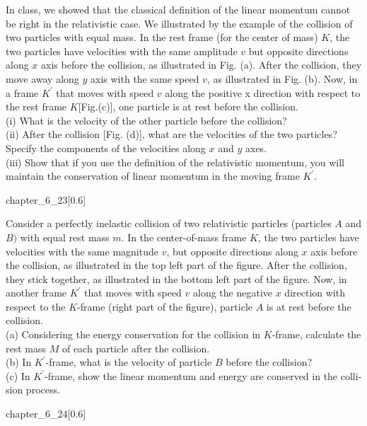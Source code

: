 \begin{example}
    In class, we showed that the classical definition of the linear
momentum cannot be right in the relativistic case. We illustrated by the
example of the collision of two particles with equal mass. In the rest
frame (for the center of mass) $K$, the two particles have velocities with
the same amplitude $v$ but opposite directions along $x$ axis before the
collision, as illustrated in Fig. (a). After the collision, they move away along $y$ axis with the same speed $v$, as illustrated in Fig. (b). Now, in a frame $K^\prime$ that moves with speed $v$ along the positive x direction with respect to the rest frame $K[$Fig.(c)], one particle is at rest before the
collision. 
\\(i) What is the velocity of the other particle before the
collision? 
\\(ii) After the collision [Fig. (d)], what are the velocities of
the two particles? Specify the components of the velocities along $x$ and
$y$ axes.
\\(iii) Show that if you use the definition of the relativistic
momentum, you will maintain the conservation of linear momentum in
the moving frame $K^{\prime}.$
\begin{singlefigure}{chapter_6_23}[0.6]   
\end{singlefigure}
\end{example}
\begin{example}
    Consider a perfectly inelastic collision of two relativistic particles (particles $A$ and $B)$ with equal rest mass $m.$ In the center-of-mass frame $K$, the two particles have velocities with the same magnitude $v$, but opposite directions along $x$ axis before the collision, as illustrated in the top left part of the figure. After the collision, they stick together, as illustrated in the bottom left part of the figure. Now, in another frame $K^\prime$ that moves with speed $v$ along the negative $x$ direction with respect to the $K$-frame (right part of the figure), particle $A$ is at rest before the collision.
    \\(a) Considering the energy conservation for the collision in $K$-frame, calculate the
    rest mass $M$ of each particle after the collision.
    \\(b) In $K^{\prime}$-frame, what is the velocity of particle $B$ before the collision?
    \\(c) In $K^{\prime}$-frame, show the linear momentum and energy are conserved in the colli-sion process.
    \begin{singlefigure}{chapter_6_24}[0.6]    
    \end{singlefigure}
\end{example}
